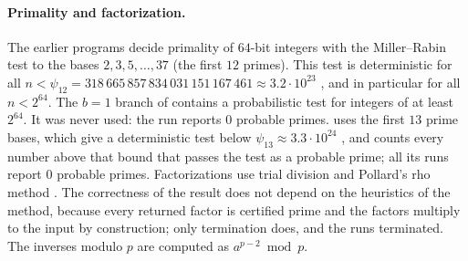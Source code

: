 \documentclass[11pt]{article}
\begin{document}
\paragraph{Primality and factorization.}
The earlier programs decide primality of $64$-bit integers with the Miller--Rabin test \cite{Rabin1980} to the bases $2,3,5,\dots,37$ (the first $12$ primes).
This test is deterministic for all $n<\psi_{12}=318\,665\,857\,834\,031\,151\,167\,461\approx3.2\cdot10^{23}$ \cite{SorensonWebster2017}, and in particular for all $n<2^{64}$.
The $b=1$ branch of  contains a probabilistic test for integers of at least $2^{64}$. It was never used: the run reports $0$ probable primes.
 uses the first $13$ prime bases, which give a deterministic test below $\psi_{13}\approx3.3\cdot10^{24}$ \cite{SorensonWebster2017}, and counts every number above that bound that passes the test as a probable prime; all its runs report $0$ probable primes.
Factorizations use trial division and Pollard's rho method \cite{Pollard1975}. The correctness of the result does not depend on the heuristics of the method, because every returned factor is certified prime and the factors multiply to the input by construction; only termination does, and the runs terminated.
The inverses modulo $p$ are computed as $a^{p-2}\bmod p$.
\end{document}
